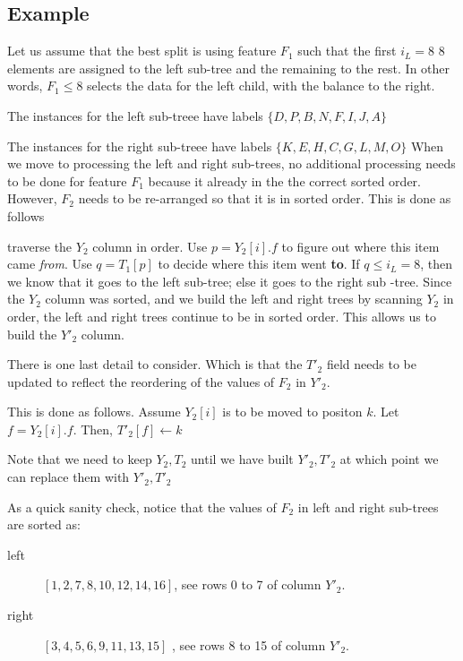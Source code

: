 \documentclass[12pt,letterpaper]{article}
\begin{document}
\subsection{Example}

Let us assume that the best split is using feature \(F_1\) such that the 
first \(i_L = 8\) 8
elements are assigned to the left sub-tree and the remaining to the rest.
In other words, \(F_1 \leq 8\) selects the data for the left child, with the
balance to the right.
\bi
\item The instances for the left sub-treee have labels 
  \(\{D, P, B, N, F, I, J, A\}\)
\item The instances for the right sub-treee have labels 
  \(\{K, E, H, C, G, L, M, O\}\)
\ei
When we move to processing the left and right sub-trees, no
additional processing needs to be done for feature \(F_1\) because it already in the the correct sorted order. 
However,  \(F_2\) needs to be re-arranged so that it is in sorted order. This is
done as follows
\be
\item traverse the \(Y_2\) column in order. Use \(p = Y_2[i].f\) to figure out where
this item came {\em from}. Use \(q = T_1[p]\) to decide where this item went {\bf
to}. If \(q \leq i_L = 8\), then we know that it goes to the left sub-tree; else
it goes to the right sub -tree. Since the \(Y_2\) column was sorted, and we
build the left and right trees by scanning \(Y_2\) in order, the left
and right trees continue to be in sorted order. 
This allows us to build the \(Y'_2\) column. 
\item 
There is one last detail to consider. Which is that the \(T'_2\) field needs to
be updated to reflect the reordering of the values of \(F_2\) in \(Y'_2\).

This is done as follows. Assume \(Y_2[i]\) is to be moved to positon \(k\). Let
\(f = Y_2[i].f\). Then, \(T'_2[f] \leftarrow k\)
\ee

Note that we need to keep \(Y_2, T_2\) until we have built \(Y'_2, T'_2\) at
which point we can replace them with \(Y'_2, T'_2\)

As a quick sanity check, notice that the values of \(F_2\) in left and right
sub-trees are sorted as:
\begin{description}
  \item [left] 
\([1, 2, 7, 8, 10, 12, 14, 16]\), see rows 0 to 7 of column \(Y'_2\).
\item [right] 
\([3, 4, 5, 6, 9, 11, 13, 15]\) , see rows 8 to 15 of column \(Y'_2\).
\end{description}
\end{document}
